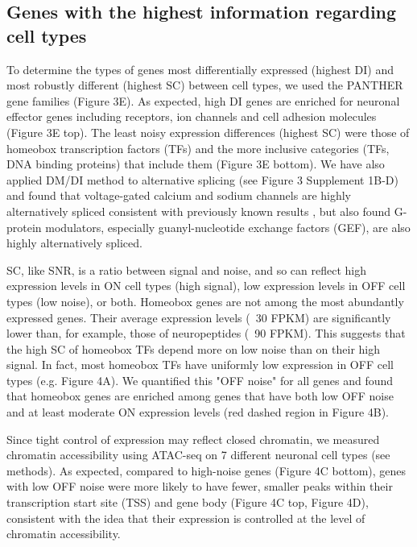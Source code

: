\subsection{Genes with the highest information regarding cell types}

To determine the types of genes most differentially expressed (highest DI) and most robustly different (highest SC) between cell types, we used the PANTHER \citep{Thomas_2003} gene families (Figure 3E). As expected, high DI genes are enriched for neuronal effector genes including receptors, ion channels and cell adhesion molecules (Figure 3E top). The least noisy expression differences (highest SC) were those of homeobox transcription factors (TFs) and the more inclusive categories (TFs, DNA binding proteins) that include them (Figure 3E bottom). We have also applied DM/DI method to alternative splicing (see Figure 3 Supplement 1B-D) and found that voltage-gated calcium and sodium channels are highly alternatively spliced consistent with previously known results \citep[e.g.][]{Lipscombe_2013}, but also found G-protein modulators, especially guanyl-nucleotide exchange factors (GEF), are also highly alternatively spliced. 

SC, like SNR, is a ratio between signal and noise, and so can reflect high expression levels in ON cell types (high signal), low expression levels in OFF cell types (low noise), or both. Homeobox genes are not among the most abundantly expressed genes. Their average expression levels (~30 FPKM) are significantly lower than, for example, those of neuropeptides (~90 FPKM). This suggests that the high SC of homeobox TFs depend more on low noise than on their high signal. In fact, most homeobox TFs have uniformly low expression in OFF cell types (e.g. Figure 4A). We quantified this "OFF noise" for all genes and found that homeobox genes are enriched among genes that have both low OFF noise and at least moderate ON expression levels (red dashed region in Figure 4B).

Since tight control of expression may reflect closed chromatin, we measured chromatin accessibility using ATAC-seq \citep{Buenrostro_2013} on 7 different neuronal cell types (see methods). As expected, compared to high-noise genes (Figure 4C bottom), genes with low OFF noise were more likely to have fewer, smaller peaks within their transcription start site (TSS) and gene body (Figure 4C top, Figure 4D), consistent with the idea that their expression is controlled at the level of chromatin accessibility.

